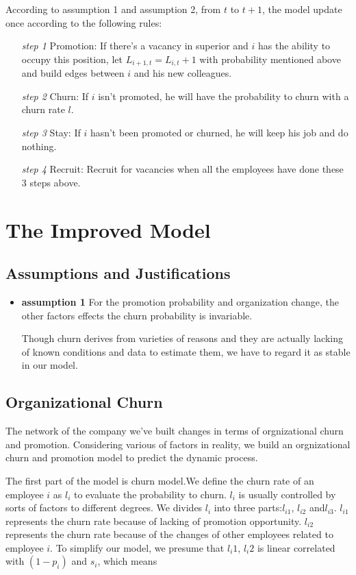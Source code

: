\documentclass[12pt,a4paper,titlepage]{article}
\begin{document}
According to assumption 1 and assumption 2, from $t$ to $t+1$, the
model update once according to the following rules:

\begin{itemize}
\item [\textit{step 1}] Promotion: If there's a vacancy in superior
  and $i$ has the ability to occupy this position, let $L_{i+1,t} =
  L_{i,t}+1$ with probability mentioned above and build edges between
  $i$ and his new colleagues.
\item [\textit{step 2}] Churn: If $i$ isn't promoted, he will have the
  probability to churn with a churn rate $l$.
\item [\textit{step 3}] Stay: If $i$ hasn't been promoted or churned,
  he will keep his job and do nothing.
\item [\textit{step 4}] Recruit: Recruit for vacancies when all the
  employees have done these 3 steps above.
\end{itemize}

\section{The Improved Model}
\label{sec:the-improved-model}

\subsection{Assumptions and Justifications}

\begin{itemize}
\item \textbf{assumption 1} For the promotion probability and
  organization change, the other factors effects the churn probability
  is invariable.

Though churn derives from varieties of reasons and they are actually
lacking of known conditions and data to estimate them, we have to
regard it as stable in our model.
\end{itemize}

\subsection{Organizational Churn}

The network of the company we've built changes in terms of
orgnizational churn and promotion. Considering various of factors in
reality, we build an orgnizational churn and promotion model to
predict the dynamic process.

The first part of the model is churn model.We define the churn rate of
an employee $i$ as $l_i$ to evaluate the probability to churn. $l_i$ is
usually controlled by sorts of factors to different degrees. We
divides $l_i$ into three parts:$l_{i1}$, $l_{i2}$ and$l_{i3}$.  $l_{i1}$
represents the churn rate because of lacking of promotion
opportunity. $l_{i2}$ represents the churn rate because of the changes
of other employees related to employee $i$. To simplify our model, we
presume that $l_i1$, $l_i2$ is linear correlated with $(1-p_i)$ and
$s_i$, which means
\end{document}
